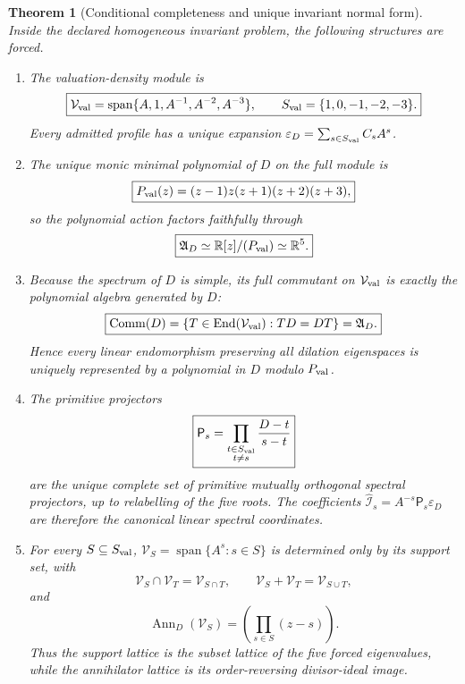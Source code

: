\documentclass[11pt,a4paper]{article}
\def\Dil{D}%
\numberwithin{equation}{section}
\theoremstyle{definition}
\theoremstyle{plain}
\newtheorem{theorem}[criterion]{Theorem}
\theoremstyle{remark}
\newcommand{\Dil}{\mathscr{D}}
\newcommand{\epsD}{\varepsilon_D}
\begin{document}
\begin{theorem}[Conditional completeness and unique invariant normal form]
\label{thm:uniqueness-envelope}
Inside the declared homogeneous invariant problem, the following structures are
forced.
\begin{enumerate}
\item The valuation-density module is
\begin{equation}
\boxed{
\mathcal V_{\rm val}=\operatorname{span}\{A,1,A^{-1},A^{-2},A^{-3}\},
\qquad
S_{\rm val}=\{1,0,-1,-2,-3\}.}
\end{equation}
Every admitted profile has a unique expansion
\(\epsD=\sum_{s\in S_{\rm val}}C_sA^s\).

\item The unique monic minimal polynomial of \(\Dil\) on the full module is
\begin{equation}
\boxed{P_{\rm val}(z)=(z-1)z(z+1)(z+2)(z+3),}
\end{equation}
so the polynomial action factors faithfully through
\begin{equation}
\boxed{
\mathfrak A_{\Dil}\simeq\mathbb R[z]/(P_{\rm val})\simeq\mathbb R^5.}
\end{equation}

\item Because the spectrum of \(\Dil\) is simple, its full commutant on
\(\mathcal V_{\rm val}\) is exactly the polynomial algebra generated by
\(\Dil\):
\begin{equation}
\boxed{
\operatorname{Comm}(\Dil)
=\{T\in\operatorname{End}(\mathcal V_{\rm val}):T\Dil=\Dil T\}
=\mathfrak A_{\Dil}.}
\end{equation}
Hence every linear endomorphism preserving all dilation eigenspaces is uniquely
represented by a polynomial in \(\Dil\) modulo \(P_{\rm val}\).

\item The primitive projectors
\begin{equation}
\boxed{
\mathsf P_s=
\prod_{\substack{t\in S_{\rm val}\\t\neq s}}
\frac{\Dil-t}{s-t}}
\end{equation}
are the unique complete set of primitive mutually orthogonal spectral
projectors, up to relabelling of the five roots.  The coefficients
\(\widehat{\mathcal I}_s=A^{-s}\mathsf P_s\epsD\) are therefore the canonical
linear spectral coordinates.

\item For every \(S\subseteq S_{\rm val}\),
\(\mathcal V_S=\operatorname{span}\{A^s:s\in S\}\) is determined only by its
support set, with
\begin{equation}
\mathcal V_S\cap\mathcal V_T=\mathcal V_{S\cap T},
\qquad
\mathcal V_S+\mathcal V_T=\mathcal V_{S\cup T},
\end{equation}
and
\begin{equation}
\boxed{
\operatorname{Ann}_{\Dil}(\mathcal V_S)
=\left(\prod_{s\in S}(z-s)\right).}
\end{equation}
Thus the support lattice is the subset lattice of the five forced eigenvalues,
while the annihilator lattice is its order-reversing divisor-ideal image.


\end{enumerate}
\end{theorem}
\end{document}

